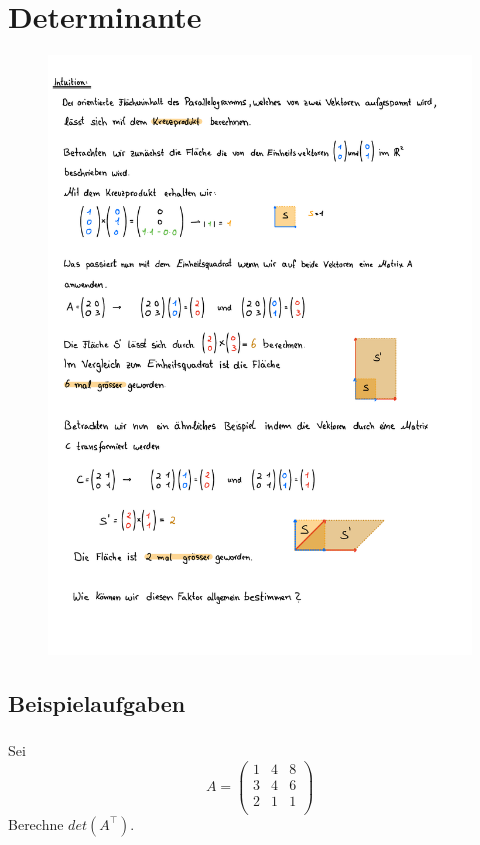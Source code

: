 \section{Determinante}
\begin{figure}[h!]
    \includegraphics[page=1, scale=0.842]{pdf/03_Determinante.pdf}
\end{figure}
\newpage


\subsection{Beispielaufgaben} 
\vspace{1cm}
\subsubsection{} %
Sei
\[
A = \begin{pmatrix}
1 & 4 & 8 \\
3 & 4 & 6 \\
2 & 1 & 1 \\
\end{pmatrix}
\]
Berechne $det(A^\top)$. \\

